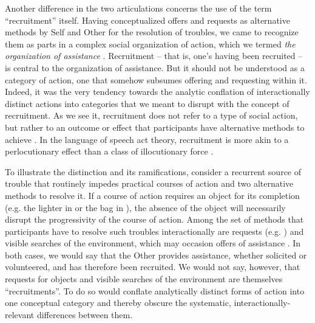 \documentclass[output=paper,nonflat,modfont,draft]{langsci/langscibook}
\begin{document}
Another difference in the two articulations concerns the use of the term “recruitment” itself. Having conceptualized offers and requests as alternative methods by Self and Other for the resolution of troubles, we came to recognize them as parts in a complex social organization of action, which we termed \textit{the organization of assistance} \citep{KendrickDrew2016}. Recruitment -- that is, one’s having been recruited -- is central to the organization of assistance. But it should not be understood as a category of action, one that somehow subsumes offering and requesting within it. Indeed, it was the very tendency towards the analytic conflation of interactionally distinct actions into categories that we meant to disrupt with the concept of recruitment. As we see it, recruitment does not refer to a type of social action, but rather to an outcome or effect that participants have alternative methods to achieve \citep[2]{KendrickDrew2016}. In the language of speech act theory, recruitment is more akin to a perlocutionary effect \citep{austin_how_1962} than a class of illocutionary force \citep{Searle1976}.

To illustrate the distinction and its ramifications, consider a recurrent source of trouble that routinely impedes practical courses of action and two alternative methods to resolve it. If a course of action requires an object for its completion (e.g. the lighter in  or the bag in ), the absence of the object will necessarily disrupt the progressivity of the course of action. Among the set of methods that participants have to resolve such troubles interactionally are requests (e.g. ) and visible searches of the environment, which may occasion offers of assistance \citep[see][]{DrewKendrick2017}. In both cases, we would say that the Other provides assistance, whether solicited or volunteered, and has therefore been recruited. We would not say, however, that requests for objects and visible searches of the environment are themselves “recruitments”. To do so would conflate analytically distinct forms of action into one conceptual category and thereby obscure the systematic, interactionally-relevant differences between them.
\end{document}
